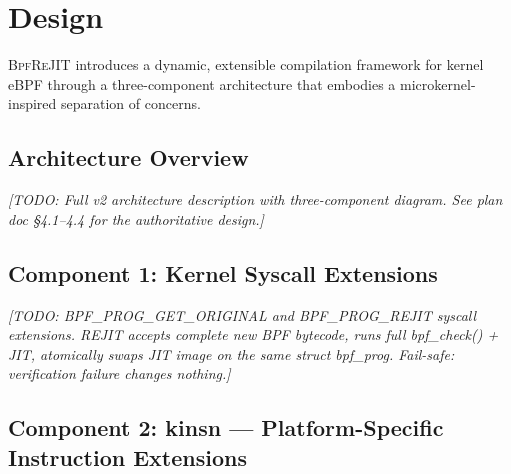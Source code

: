 


\section{Design}
\label{sec:design}


\textsc{BpfReJIT} introduces a dynamic, extensible compilation
framework for kernel eBPF through a three-component architecture that
embodies a microkernel-inspired separation of concerns.

\subsection{Architecture Overview}
\label{sec:architecture}

\textit{[TODO: Full v2 architecture description with three-component
diagram. See plan doc \S4.1--4.4 for the authoritative design.]}

\subsection{Component 1: Kernel Syscall Extensions}
\label{sec:syscall}

\textit{[TODO: BPF\_PROG\_GET\_ORIGINAL and BPF\_PROG\_REJIT syscall
extensions. REJIT accepts complete new BPF bytecode, runs full
bpf\_check() + JIT, atomically swaps JIT image on the same struct
bpf\_prog. Fail-safe: verification failure changes nothing.]}

\subsection{Component 2: kinsn --- Platform-Specific Instruction Extensions}
\label{sec:kinsn}

